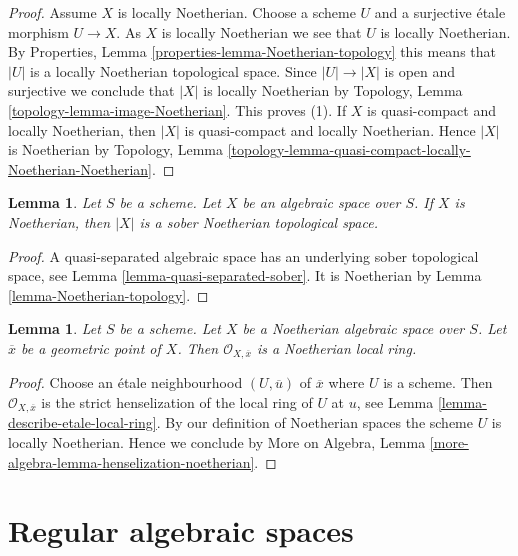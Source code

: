 \documentclass{stacks-project}
\theoremstyle{plain}
\newtheorem{lemma}[subsection]{Lemma}
\theoremstyle{definition}
\theoremstyle{remark}
\numberwithin{equation}{subsection}
\begin{document}
\begin{proof}
Assume $X$ is locally Noetherian.
Choose a scheme $U$ and a surjective \'etale morphism
$U \to X$. As $X$ is locally Noetherian we see that $U$ is locally
Noetherian. By
Properties, Lemma \ref{properties-lemma-Noetherian-topology}
this means that $|U|$ is a locally Noetherian topological space.
Since $|U| \to |X|$ is open and surjective we conclude that
$|X|$ is locally Noetherian by
Topology, Lemma \ref{topology-lemma-image-Noetherian}.
This proves (1). If $X$ is quasi-compact and locally Noetherian,
then $|X|$ is quasi-compact and locally Noetherian. Hence $|X|$
is Noetherian by
Topology,
Lemma \ref{topology-lemma-quasi-compact-locally-Noetherian-Noetherian}.
\end{proof}

\begin{lemma}
\label{lemma-Noetherian-sober}
Let $S$ be a scheme. Let $X$ be an algebraic space over $S$.
If $X$ is Noetherian, then $|X|$ is a sober Noetherian topological space.
\end{lemma}

\begin{proof}
A quasi-separated algebraic space has an underlying sober topological
space, see
Lemma \ref{lemma-quasi-separated-sober}.
It is Noetherian by
Lemma \ref{lemma-Noetherian-topology}.
\end{proof}

\begin{lemma}
\label{lemma-Noetherian-local-ring-Noetherian}
Let $S$ be a scheme. Let $X$ be a Noetherian algebraic space over $S$.
Let $\overline{x}$ be a geometric point of $X$. Then
$\mathcal{O}_{X, \overline{x}}$ is a Noetherian local ring.
\end{lemma}

\begin{proof}
Choose an \'etale neighbourhood $(U, \overline{u})$ of $\overline{x}$
where $U$ is a scheme. Then $\mathcal{O}_{X, \overline{x}}$ is the
strict henselization of the local ring of $U$ at $u$, see
Lemma \ref{lemma-describe-etale-local-ring}.
By our definition of Noetherian spaces the scheme $U$ is locally Noetherian.
Hence we conclude by
More on Algebra, Lemma \ref{more-algebra-lemma-henselization-noetherian}.
\end{proof}








\section{Regular algebraic spaces}
\label{section-regular}
\end{document}

